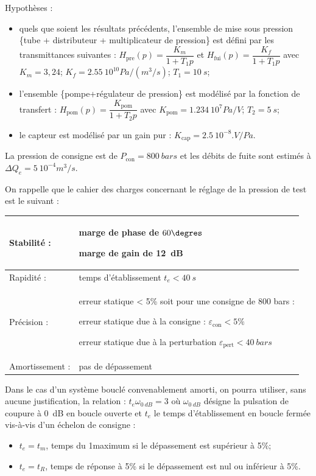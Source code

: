 \documentclass[10pt,fleqn]{article} %
\begin{document}
\begin{multicols}{2}
Hypothèses : 
\begin{itemize}
\item quels que soient les résultats précédents, l’ensemble de mise sous pression \{tube + distributeur + multiplicateur de pression\} est défini par les transmittances suivantes :
$H_{\text{pre}} (p)=\dfrac{K_m}{1+T_1 p}$ et $H_{\text{fui}} (p)=\dfrac{K_f}{1+T_1 p}$
avec $K_m = 3,24$; $K_f = \SI{2,55}{10^{10} Pa/(m^3/s)}$; $T_1  =\SI{10}{s}$; 
\item l’ensemble \{pompe+régulateur de pression\} est modélisé par la fonction de transfert :
$H_{\text{pom}} (p)=\dfrac{K_{\text{pom}}}{1+T_2 p}$ avec $K_{\text{pom}} = \SI{1,234}{10^7 Pa/V}$; 	$T_2 = \SI{5}{s}$;
\item le capteur est modélisé par un gain pur :	$K_{\text{cap}}= \SI{2,5}{10^{-8}.V/Pa}$.
\end{itemize}

La pression de consigne est de $P_{\text{con}} = \SI{800}{bars}$ et les débits de fuite sont estimés à $\Delta Q_e = \SI{5}{10^{-4} m^3/s}$.

On rappelle que le cahier des charges concernant le réglage de la pression de test est le suivant :
\begin{center}
\begin{tabular}{|l|p{5cm}|}
\hline
Stabilité : & marge de phase de $60\degres$

 marge de gain de \SI{12}{dB} \\ \hline
Rapidité :	&temps d’établissement $t_e < \SI{40}{s}$ \\ \hline
Précision :&	erreur statique < 5\% soit pour une consigne de 800 bars :

erreur statique due à la consigne : $\varepsilon_{\text{con}} < 5\%$ 

erreur statique due à la perturbation $\varepsilon_{\text{pert}} < \SI{40}{bars}$ \\ \hline

Amortissement :&	pas de dépassement \\ \hline
\end{tabular}
\end{center}

Dans le cas d’un système bouclé convenablement amorti, on pourra utiliser, sans aucune justification, la relation : 	$t_e \omega_{\SI{0}{dB}}=3$ 
où $\omega_{\SI{0}{dB}}$ désigne la pulsation de coupure à \SI{0}{dB} en boucle ouverte et $t_e$ le temps d’établissement en boucle fermée vis-à-vis d’un échelon de consigne :
\begin{itemize}
\item $t_e = t_m$, temps du 1\ier maximum si le dépassement est supérieur à 5\%;
\item $t_e = t_R$, temps de réponse à 5\% si le dépassement est nul ou inférieur à 5\%.
\end{itemize}


\end{multicols}
\end{document}
